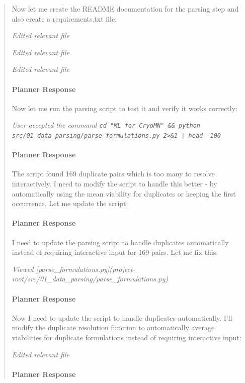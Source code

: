 \documentclass[preprint,12pt]{elsarticle}
\newenvironment{promptbar}{\begin{quote}\scriptsize\raggedright\sloppy}{\end{quote}}
\begin{document}
\begin{promptbar}
Now let me create the README documentation for the parsing step and also create a requirements.txt file:

\textit{Edited relevant file}

\textit{Edited relevant file}

\textit{Edited relevant file}

\paragraph*{Planner Response}

Now let me run the parsing script to test it and verify it works correctly:

\textit{User accepted the command \texttt{cd "ML for CryoMN" \&\& python src/01\_data\_parsing/parse\_formulations.py 2>\&1 | head -100}}

\paragraph*{Planner Response}

The script found 169 duplicate pairs which is too many to resolve interactively. I need to modify the script to handle this better - by automatically using the mean viability for duplicates or keeping the first occurrence. Let me update the script:

\paragraph*{Planner Response}

I need to update the parsing script to handle duplicates automatically instead of requiring interactive input for 169 pairs. Let me fix this:

\textit{Viewed [parse\_formulations.py](project-root/src/01\_data\_parsing/parse\_formulations.py)}

\paragraph*{Planner Response}

Now I need to update the script to handle duplicates automatically. I'll modify the duplicate resolution function to automatically average viabilities for duplicate formulations instead of requiring interactive input:

\textit{Edited relevant file}

\paragraph*{Planner Response}


\end{promptbar}
\end{document}
